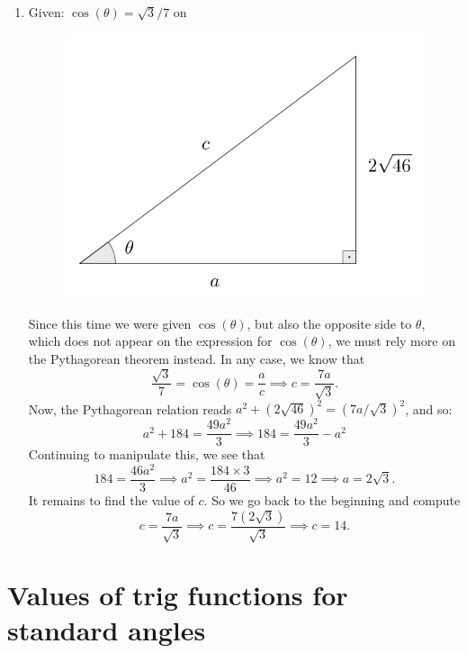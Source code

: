 \documentclass{ximera}
\begin{document}
\begin{example}
\begin{enumerate}[label=\alph*.]
  \item Given: $\cos(\theta) = \sqrt{3}/7$ on

    \begin{figure}[h]
      \centering
      \includegraphics[scale=.3]{./figures/9-1-1-triangle-cos-2sqrt46.png}
    \end{figure}

    \begin{explanation}
      Since this time we were given $\cos(\theta)$, but also the opposite side to $\theta$, which does not appear on the expression for $\cos(\theta)$, we must rely more on the Pythagorean theorem instead. In any case, we know that $$\frac{\sqrt{3}}{7}= \cos(\theta)=\frac{a}{c}  \implies c = \frac{7a}{\sqrt{3}}. $$Now, the Pythagorean relation reads $a^2 + (2\sqrt{46})^2 = (7a/\sqrt{3})^2$, and so: $$a^2 + 184 = \frac{49a^2}{3} \implies 184 = \frac{49a^2}{3}-a^2$$Continuing to manipulate this, we see that $$184 = \frac{46a^2}{3} \implies a^2 = \frac{184 \times 3}{46} \implies a^2 = 12 \implies a = 2\sqrt{3}.$$It remains to find the value of $c$. So we go back to the beginning and compute $$c = \frac{7a}{\sqrt{3}}\implies c = \frac{7(2\sqrt{3})}{\sqrt{3}} \implies c=14.$$
    \end{explanation}
    
  \end{enumerate}
\end{example}


\section{Values of trig functions for standard angles}
\end{document}
